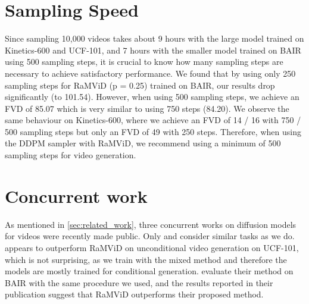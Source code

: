 \documentclass[10pt]{article} \usepackage[accepted]{tmlr}
\begin{document}
\section{Sampling Speed}
 Since sampling 10,000 videos takes about 9 hours with the large model trained on Kinetics-600 and UCF-101, and 7 hours with the smaller model trained on BAIR using 500 sampling steps, it is crucial to know how many sampling steps are necessary to achieve satisfactory performance. We found that by using only 250 sampling steps for RaMViD (p = 0.25) trained on BAIR, our results drop significantly (to 101.54). However, when using 500 sampling steps, we achieve an FVD of 85.07 which is very similar to using 750 steps (84.20). We observe the same behaviour on Kinetics-600, where we achieve an FVD of 14 / 16 with 750 / 500 sampling steps but only an FVD of 49 with 250 steps. Therefore, when using the DDPM sampler with RaMViD, we recommend using a minimum of 500 sampling steps for video generation.

\section{Concurrent work}
As mentioned in \cref{sec:related_work}, three concurrent works on diffusion models for videos were recently made public. Only \citet{ho_2022} and \citet{voleti_2022} consider similar tasks as we do. \citet{ho_2022} appears to outperform RaMViD on unconditional video generation on UCF-101, which is not surprising, as we train with the mixed method and therefore the models are mostly trained for conditional generation. \citet{voleti_2022} evaluate their method on BAIR with the same procedure we used, and the results reported in their publication suggest that RaMViD outperforms their proposed method.
\end{document}

